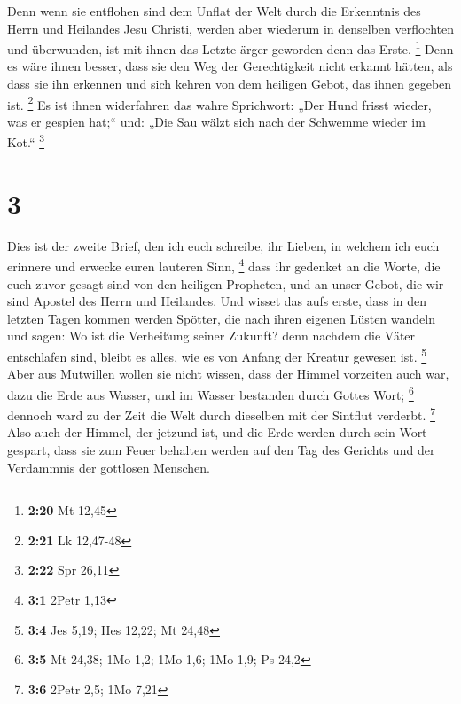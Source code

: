  Denn wenn sie entflohen sind dem Unflat der Welt durch die
Erkenntnis des Herrn und Heilandes Jesu Christi, werden aber wiederum in
denselben verflochten und überwunden, ist mit ihnen das Letzte ärger
geworden denn das Erste. \footnote{\textbf{2:20} Mt 12,45} 
Denn es wäre ihnen besser, dass sie den Weg der Gerechtigkeit nicht
erkannt hätten, als dass sie ihn erkennen und sich kehren von dem
heiligen Gebot, das ihnen gegeben ist. \footnote{\textbf{2:21} Lk
  12,47-48}  Es ist ihnen widerfahren das wahre Sprichwort:
„Der Hund frisst wieder, was er gespien hat;`` und: „Die Sau wälzt sich
nach der Schwemme wieder im Kot.`` \footnote{\textbf{2:22} Spr 26,11}

\hypertarget{section-1}{%
\section{3}\label{section-1}}

 Dies ist der zweite Brief, den ich euch schreibe, ihr
Lieben, in welchem ich euch erinnere und erwecke euren lauteren Sinn,
\footnote{\textbf{3:1} 2Petr 1,13}  dass ihr gedenket an die
Worte, die euch zuvor gesagt sind von den heiligen Propheten, und an
unser Gebot, die wir sind Apostel des Herrn und Heilandes. 
Und wisset das aufs erste, dass in den letzten Tagen kommen werden
Spötter, die nach ihren eigenen Lüsten wandeln  und sagen:
Wo ist die Verheißung seiner Zukunft? denn nachdem die Väter entschlafen
sind, bleibt es alles, wie es von Anfang der Kreatur gewesen ist.
\footnote{\textbf{3:4} Jes 5,19; Hes 12,22; Mt 24,48}  Aber
aus Mutwillen wollen sie nicht wissen, dass der Himmel vorzeiten auch
war, dazu die Erde aus Wasser, und im Wasser bestanden durch Gottes
Wort; \footnote{\textbf{3:5} Mt 24,38; 1Mo 1,2; 1Mo 1,6; 1Mo 1,9; Ps
  24,2}  dennoch ward zu der Zeit die Welt durch dieselben
mit der Sintflut verderbt. \footnote{\textbf{3:6} 2Petr 2,5; 1Mo 7,21}
 Also auch der Himmel, der jetzund ist, und die Erde werden
durch sein Wort gespart, dass sie zum Feuer behalten werden auf den Tag
des Gerichts und der Verdammnis der gottlosen Menschen.

